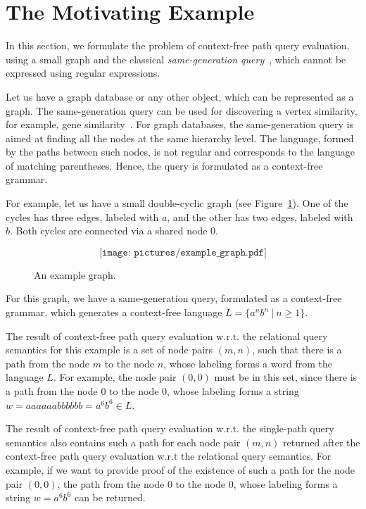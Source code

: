 \section{The Motivating Example}
\label{section_motivating}

In this section, we formulate the problem of context-free path query evaluation, using a small graph and the classical \emph{same-generation query}~\cite{FndDB}, which cannot be expressed using regular expressions.

Let us have a graph database or any other object, which can be represented as a graph. The same-generation query can be used for discovering a vertex similarity, for example, gene similarity~\cite{GraphQueryWithEarley}. For graph databases, the same-generation query is aimed at finding all the nodes at the same hierarchy level. The language, formed by the paths between such nodes, is not regular and corresponds to the language of matching parentheses. Hence, the query is formulated as a context-free grammar.

For example, let us have a small double-cyclic graph (see Figure~\ref{Example_Graph}). One of the cycles has three edges, labeled with $a$, and the other has two edges, labeled with $b$. Both cycles are connected via a shared node $0$.

\begin{figure}[h]
	\[
	\texttt{[image: pictures/example\_graph.pdf]}
	\]
	\caption{An example graph.}
	\label{Example_Graph}
\end{figure}

For this graph, we have a same-generation query, formulated as a context-free grammar, which generates a context-free language \mbox{$L=\{a^n b^n~|~n \geq 1\}$}.

The result of context-free path query evaluation w.r.t. the relational query semantics for this example is a set of node pairs \mbox{$(m, n)$}, such that there is a path from the node $m$ to the node $n$, whose labeling forms a word from the language $L$. For example, the node pair \mbox{$(0,0)$} must be in this set, since there is a path from the node $0$ to the node $0$, whose labeling forms a string \mbox{$w = aaaaaabbbbbb = a^6b^6 \in L$}.

The result of context-free path query evaluation w.r.t. the single-path query semantics also contains such a path for each node pair \mbox{$(m, n)$} returned after the context-free path query evaluation w.r.t the relational query semantics. For example, if we want to provide proof of the existence of such a path for the node pair \mbox{$(0,0)$}, the path from the node $0$ to the node $0$, whose labeling forms a string \mbox{$w = a^6b^6$} can be returned. 